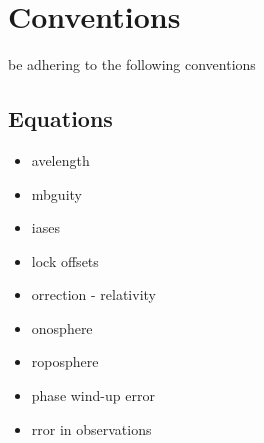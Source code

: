 \chapter{Conventions}
\label{ch:conventions}

 be adhering to the following conventions

\section{Equations}

\begin{itemize}
	\item {\LARGE{\boldmath{$\omega$}}}avelength
	\item {\LARGE{\boldmath{$\alpha$}}}mbguity
	\item {\LARGE{\boldmath{$\beta$}}}iases
	\item {\LARGE{\boldmath{$\zeta$}}}lock offsets
	\item {\LARGE{\boldmath{$\kappa$}}}orrection - relativity
	\item {\LARGE{\boldmath{$\iota$}}}onosphere
	\item {\LARGE{\boldmath{$\tau$}}}roposphere
	\item {\LARGE{\boldmath{$\xi$}}} phase wind-up error
	\item {\LARGE{\boldmath{$\epsilon$}}}rror in observations	
\end{itemize}
